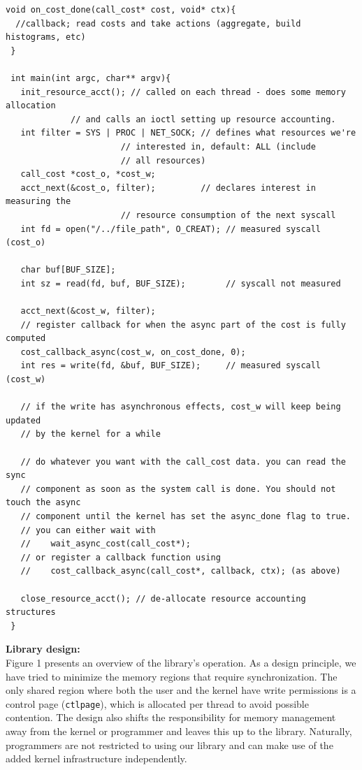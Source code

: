 \documentclass[12pt]{article}
\def\_{\textunderscore\-}
\begin{document}
\vspace{1em}
\lstset{style=customc, captionpos=b}
\begin{lstlisting}[caption=Sample code using the \texttt{rsrcfl} library]
 void on_cost_done(call_cost* cost, void* ctx){
  //callback; read costs and take actions (aggregate, build histograms, etc)
 }

 int main(int argc, char** argv){
   init_resource_acct(); // called on each thread - does some memory allocation
			 // and calls an ioctl setting up resource accounting.
   int filter = SYS | PROC | NET_SOCK; // defines what resources we're
				       // interested in, default: ALL (include
				       // all resources)
   call_cost *cost_o, *cost_w;
   acct_next(&cost_o, filter);         // declares interest in measuring the
				       // resource consumption of the next syscall
   int fd = open("/../file_path", O_CREAT); // measured syscall (cost_o)

   char buf[BUF_SIZE];
   int sz = read(fd, buf, BUF_SIZE);        // syscall not measured

   acct_next(&cost_w, filter);
   // register callback for when the async part of the cost is fully computed
   cost_callback_async(cost_w, on_cost_done, 0);
   int res = write(fd, &buf, BUF_SIZE);     // measured syscall (cost_w)

   // if the write has asynchronous effects, cost_w will keep being updated 
   // by the kernel for a while

   // do whatever you want with the call_cost data. you can read the sync
   // component as soon as the system call is done. You should not touch the async
   // component until the kernel has set the async_done flag to true.
   // you can either wait with
   //    wait_async_cost(call_cost*);
   // or register a callback function using
   //    cost_callback_async(call_cost*, callback, ctx); (as above)

   close_resource_acct(); // de-allocate resource accounting structures
 }
 \end{lstlisting}
 
\noindent\textbf{Library design:\\}
Figure 1 presents an overview of the library's operation. As a design principle, we have tried to minimize the memory regions that require synchronization. The only shared region where both the user and the kernel have write permissions is a control page (\texttt{ctl\_page}), which is allocated per thread to avoid possible contention.
The design also shifts the responsibility for memory management away from the kernel or programmer and leaves this up to the library.
Naturally, programmers are not restricted to using our library and can make use of the added kernel infrastructure independently.
\end{document}
